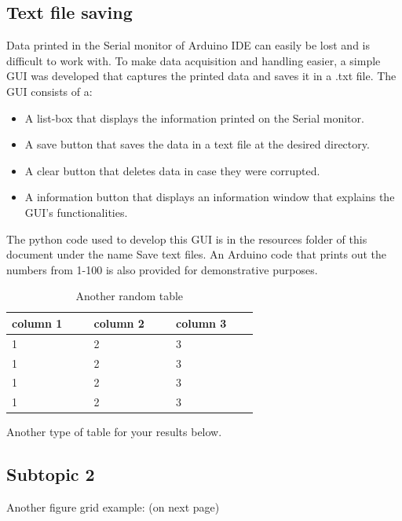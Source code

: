 {\subsection{Text file saving}
Data printed in the Serial monitor of Arduino IDE can easily be lost and is difficult to work with. To make data acquisition and handling easier, a simple GUI was developed that captures the printed data and saves it in a .txt file. The GUI consists of a:
\begin{itemize}
\item A list-box that displays the information printed on the Serial monitor. 
\item A save button that saves the data in a text file at the desired directory.
\item A clear button that deletes data in case they were corrupted.
\item A information button that displays an information window that explains the GUI's functionalities.
\end{itemize}

The python code used to develop this GUI is in the resources folder of this document under the name Save text files. An Arduino code that prints out the numbers from 1-100 is also provided for demonstrative purposes.

\begin{table}[ht]
    \centering
    \begin{tabular}{p{0.25\linewidth}p{0.25\linewidth}p{0.25\linewidth}}
    \hline
    column 1 & column 2 & column 3\\
    \hline
    1 & 2 & 3\\
    1 & 2 & 3\\
    1 & 2 & 3\\
    1 & 2 & 3\\
    \hline
    \end{tabular}
    \caption{Another random table}
    \label{tab:2}
\end{table}
\noindent Another type of table for your results below.

\subsection{Subtopic 2}
\lipsum[1]

\noindent Another figure grid example: (on next page)

}
